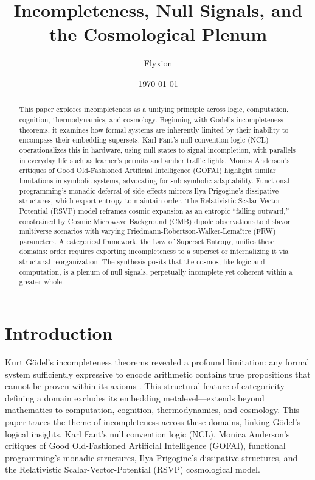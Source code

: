 \documentclass{article}
\begin{document}
\title{Incompleteness, Null Signals, and the Cosmological Plenum}
\author{Flyxion}
\date{\today}
\maketitle

\begin{abstract}
This paper explores incompleteness as a unifying principle across logic, computation, cognition, thermodynamics, and cosmology. Beginning with G\"{o}del's incompleteness theorems, it examines how formal systems are inherently limited by their inability to encompass their embedding supersets. Karl Fant's null convention logic (NCL) operationalizes this in hardware, using null states to signal incompletion, with parallels in everyday life such as learner's permits and amber traffic lights. Monica Anderson's critiques of Good Old-Fashioned Artificial Intelligence (GOFAI) highlight similar limitations in symbolic systems, advocating for sub-symbolic adaptability. Functional programming's monadic deferral of side-effects mirrors Ilya Prigogine's dissipative structures, which export entropy to maintain order. The Relativistic Scalar-Vector-Potential (RSVP) model reframes cosmic expansion as an entropic ``falling outward,'' constrained by Cosmic Microwave Background (CMB) dipole observations to disfavor multiverse scenarios with varying Friedmann-Robertson-Walker-Lema\^{i}tre (FRW) parameters. A categorical framework, the Law of Superset Entropy, unifies these domains: order requires exporting incompleteness to a superset or internalizing it via structural reorganization. The synthesis posits that the cosmos, like logic and computation, is a plenum of null signals, perpetually incomplete yet coherent within a greater whole.
\end{abstract}

\section{Introduction}
\label{sec:intro}
Kurt G\"{o}del's incompleteness theorems revealed a profound limitation: any formal system sufficiently expressive to encode arithmetic contains true propositions that cannot be proven within its axioms \citep{godel1931}. This structural feature of categoricity---defining a domain excludes its embedding metalevel---extends beyond mathematics to computation, cognition, thermodynamics, and cosmology. This paper traces the theme of incompleteness across these domains, linking G\"{o}del's logical insights, Karl Fant's null convention logic (NCL), Monica Anderson's critiques of Good Old-Fashioned Artificial Intelligence (GOFAI), functional programming's monadic structures, Ilya Prigogine's dissipative structures, and the Relativistic Scalar-Vector-Potential (RSVP) cosmological model.
\end{document}
